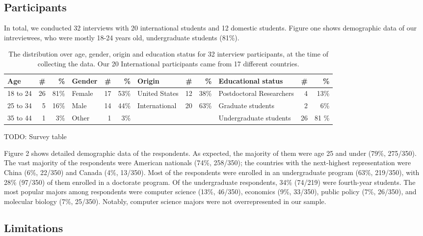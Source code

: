\subsection{Participants} In total, we conducted 32 interviews with 20
international students and 12 domestic students. Figure one shows demographic data of our intreviewees, who were mostly 18-24 years old, undergraduate students (81\%).

\begin{table*}[h!]
\centering
\begin{tabular}{l r r |l r r|l r r|l r r} 
 \hline
 Age & \# & \% & Gender & \# & \% & Origin & \# & \% & Educational status & \# & \% \\
\hline
18 to 24 & 26 & 81\% & Female & 17 & 53\% & United States & 12 & 38\% & Postdoctoral Researchers & 4 & 13\% \\
25 to 34 & 5 & 16\% & Male & 14 & 44\% & International & 20 & 63\% & Graduate students & 2 & 6\% \\
35 to 44 & 1 & 3\% & Other & 1 & 3\% & & & & Undergraduate students & 26 & 81 \% \\
 \hline
\end{tabular}
\caption{The distribution over age, gender, origin and education status for 32 interview participants, at the time of collecting the data. Our 20 International participants came from 17 different countries.}
\label{table:1}
\end{table*}


TODO: Survey table 

Figure 2 shows detailed demographic data of the respondents. As expected, the
majority of them were age 25 and under (79\%, 275/350). The vast majority of
the respondents were American nationals (74\%, 258/350); the countries with
the next-highest representation were China (6\%, 22/350) and Canada (4\%,
13/350). Most of the respondents were enrolled in an undergraduate
program (63\%, 219/350), with 28\% (97/350) of them enrolled in a doctorate
program. Of the undergraduate respondents, 34\% (74/219) were fourth-year
students. The most popular majors among respondents were computer science
(13\%, 46/350), economics (9\%, 33/350), public policy (7\%, 26/350), and
molecular biology (7\%, 25/350). Notably, computer science majors were not
overrepresented in our sample.



\subsection{Limitations}


